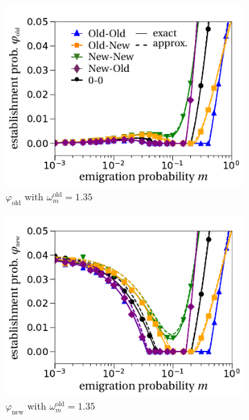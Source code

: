 \documentclass[11pt]{article}
\begin{document}
\begin{figure}[t!]
	\centering
	\begin{subfigure}{.5\textwidth}
  		\centering
  		\includegraphics[width=\linewidth]{fig2a.pdf}
  		\caption{$\varphi_{\text{old}}$ with $\omega^\text{old}_m = 1.35$}
  		\label{fig:vary_m_est_old-35}
	\end{subfigure}%
	\begin{subfigure}{.5\textwidth}
 		 \centering
 		 \includegraphics[width=\linewidth]{fig2b.pdf}
  		\caption{$\varphi_{\text{new}}$ with $\omega^\text{old}_m = 1.35$}
  		\label{fig:vary_m_est_new-35}
	\end{subfigure}
	\begin{subfigure}{.5\textwidth}

\end{subfigure}
\end{figure}
\end{document}

